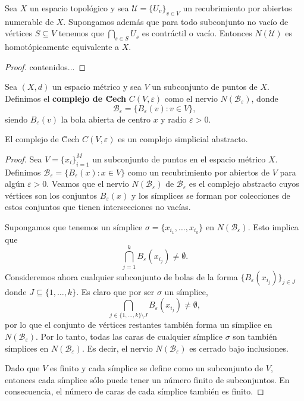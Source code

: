 \begin{teorema}
	Sea \(X\) un espacio topológico y sea \(\mathcal{U} = \{U_v\}_{v \in V}\) un recubrimiento por abiertos numerable de \(X\). Supongamos además que para todo subconjunto no vacío de vértices \(S \subseteq V\) tenemos que \(\bigcap_{s \in S} U_s\) es contráctil o vacío. Entonces \(N(\mathcal{U})\) es homotópicamente equivalente a \(X\).
\end{teorema}
\begin{proof}
	contenidos...
\end{proof}
\begin{definicion}
	Sea \((X,d)\) un espacio métrico y sea \(V\) un subconjunto de puntos de \(X\). Definimos el \textbf{complejo de \u Cech} \(C(V, \varepsilon)\) como el nervio \(N(\mathcal{B}_\varepsilon)\), donde
	\[
		\mathcal{B}_\varepsilon = \{ B_{\varepsilon}(v) : v \in V \},
	\]
	siendo \(B_{\varepsilon}(v)\) la bola abierta de centro \(x\) y radio \(\varepsilon > 0\).
\end{definicion}

\begin{proposicion}
	El complejo de \u Cech \(C(V, \varepsilon)\) es un complejo simplicial abstracto.
\end{proposicion}
\begin{proof}
	Sea \( V = \{x_i\}_{i=1}^M \) un subconjunto de puntos en el espacio métrico \( X \). Definimos \( \mathcal{B}_\varepsilon = \{B_\varepsilon(x) : x \in V \} \) como un recubrimiento por abiertos de \( V \) para algún \(\varepsilon > 0\). Veamos que el nervio \( N(\mathcal{B}_\varepsilon) \) de \( \mathcal{B}_\varepsilon \) es el complejo abstracto cuyos vértices son los conjuntos \( B_\varepsilon(x) \) y los símplices se forman por colecciones de estos conjuntos que tienen intersecciones no vacías.
	
	Supongamos que tenemos un símplice \( \sigma = \{x_{i_1}, \ldots, x_{i_k}\} \) en \( N(\mathcal{B}_\varepsilon) \). Esto implica que
	\[
	\bigcap_{j=1}^k B_\varepsilon(x_{i_j}) \neq \emptyset.
	\]
	Consideremos ahora cualquier subconjunto de bolas de la forma  \(\{B_\varepsilon(x_{i_j})\}_{j \in J}\) donde \( J \subseteq \{1, \ldots, k\} \). Es claro que por ser $\sigma$ un símplice, 
	\[
	\bigcap_{j \in \{1, \ldots, k\} \setminus J} B_\varepsilon(x_{i_j}) \neq \emptyset,
	\]
	por lo que el conjunto de vértices restantes también forma un símplice en \( N(\mathcal{B}_\varepsilon) \). Por lo tanto, todas las caras de cualquier símplice \( \sigma \) son también símplices en \( N(\mathcal{B}_\varepsilon) \). Es decir, el nervio \( N(\mathcal{B}_\varepsilon) \) es cerrado bajo inclusiones.
	
	Dado que \( V \) es finito y cada símplice se define como un subconjunto de \( V \), entonces cada símplice sólo puede tener un número finito de subconjuntos. En consecuencia, el número de caras de cada símplice también es finito.
\end{proof}

